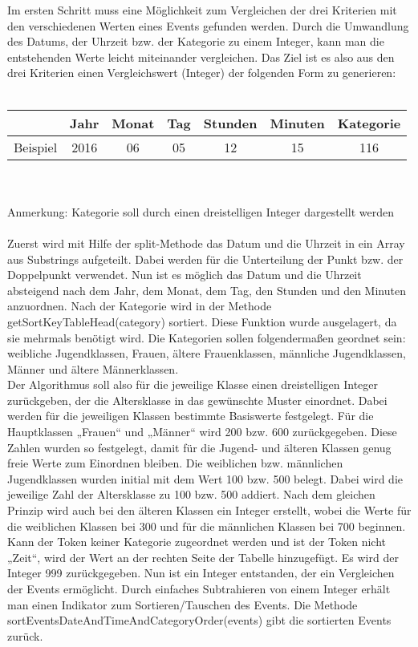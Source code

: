{Im ersten Schritt muss eine Möglichkeit zum Vergleichen der drei Kriterien mit den verschiedenen Werten eines Events gefunden werden. Durch die Umwandlung des Datums, der Uhrzeit bzw. der Kategorie zu einem Integer, kann man die entstehenden Werte leicht miteinander vergleichen. Das Ziel ist es also aus den drei Kriterien einen Vergleichswert (Integer) der folgenden Form zu generieren: \\
\\
\begin{tabular}{|l||c|c|c|c|c|c|}
\hline
 & Jahr & Monat & Tag & Stunden & Minuten & Kategorie \\
\hline
Beispiel & 2016 & 06 & 05 & 12 & 15 & 116 \\
\hline
\end{tabular} \\
\\
Anmerkung: Kategorie soll durch einen dreistelligen Integer dargestellt werden\\
\\
Zuerst wird mit Hilfe der split-Methode das Datum und die Uhrzeit in ein Array aus Substrings aufgeteilt. Dabei werden für die Unterteilung der Punkt bzw. der Doppelpunkt verwendet. Nun ist es möglich das Datum und die Uhrzeit absteigend nach dem Jahr, dem Monat, dem Tag, den Stunden und den Minuten anzuordnen. 
Nach der Kategorie wird in der Methode getSortKeyTableHead(category) sortiert. Diese Funktion wurde ausgelagert, da sie mehrmals benötigt wird. Die Kategorien sollen folgendermaßen geordnet sein: \\
weibliche Jugendklassen, Frauen, ältere Frauenklassen, männliche Jugendklassen, Männer und ältere Männerklassen. \\
Der Algorithmus soll also für die jeweilige Klasse einen dreistelligen Integer zurückgeben, der die Altersklasse in das gewünschte Muster einordnet. Dabei werden für die jeweiligen Klassen bestimmte Basiswerte festgelegt. Für die Hauptklassen „Frauen“ und „Männer“ wird 200 bzw. 600 zurückgegeben. Diese Zahlen wurden so festgelegt, damit für die Jugend- und älteren Klassen genug freie Werte zum Einordnen bleiben. Die weiblichen bzw. männlichen Jugendklassen wurden initial mit dem Wert 100 bzw. 500 belegt. Dabei wird die jeweilige Zahl der Altersklasse zu 100 bzw. 500 addiert. Nach dem gleichen Prinzip wird auch bei den älteren Klassen ein Integer erstellt, wobei die Werte für die weiblichen Klassen bei 300 und für die männlichen Klassen bei 700 beginnen. Kann der Token keiner Kategorie zugeordnet werden und ist der Token nicht „Zeit“, wird der Wert an der rechten Seite der Tabelle hinzugefügt. Es wird der Integer 999 zurückgegeben.
Nun ist ein Integer entstanden, der ein Vergleichen der Events ermöglicht. Durch einfaches Subtrahieren von einem Integer erhält man einen Indikator zum Sortieren/Tauschen des Events. Die Methode sortEventsDateAndTimeAndCategoryOrder(events) gibt die sortierten Events zurück.

}
